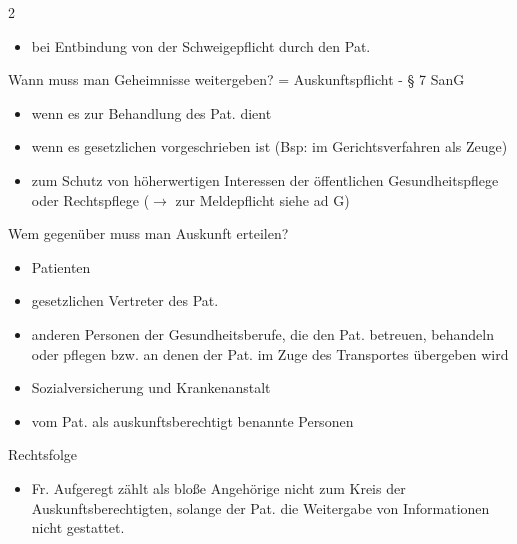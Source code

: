 \documentclass{article}
\begin{document}
\begin{multicols}{2}
\begin{itemize}
\item bei Entbindung von der Schweigepflicht durch den Pat.

\end{itemize}
Wann muss man Geheimnisse weitergeben? = Auskunftspflicht - {\S} 7 SanG

\begin{itemize}
\item wenn es zur Behandlung des Pat. dient

\item wenn es gesetzlichen vorgeschrieben ist (Bsp: im Gerichtsverfahren
als Zeuge)

\item zum Schutz von h\"oherwertigen Interessen der \"offentlichen
Gesundheitspflege oder Rechtspflege (${\rightarrow}$ zur Meldepflicht
siehe ad G)

\end{itemize}
Wem gegen\"uber muss man Auskunft erteilen?

\begin{itemize}
\item Patienten

\item gesetzlichen Vertreter des Pat.

\item anderen Personen der Gesundheitsberufe, die den Pat. betreuen,
behandeln oder pflegen bzw. an denen der Pat. im Zuge des Transportes
\"ubergeben wird

\item Sozialversicherung und Krankenanstalt

\item vom Pat. als auskunftsberechtigt benannte Personen

\end{itemize}
Rechtsfolge

\begin{itemize}
\item Fr. Aufgeregt z\"ahlt als blo{\ss}e Angeh\"orige nicht zum Kreis
der Auskunftsberechtigten, solange der Pat. die Weitergabe von
Informationen nicht gestattet. 

\end{itemize}
\end{multicols}
\end{document}
